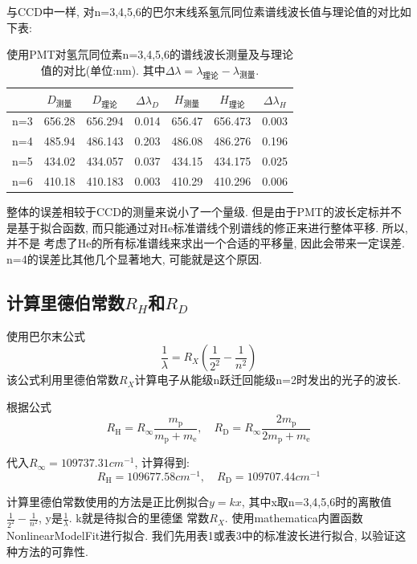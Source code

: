 \documentclass[12pt,a4paper]{article}
\begin{document}
与CCD中一样, 对n=3,4,5,6的巴尔末线系氢氘同位素谱线波长值与理论值的对比如下表: 
\begin{table}[H]
    \centering
    \begin{tabular}{|c|c|c|c|c|c|c|}
    \hline
        & $D_{\text{测量}}$      & $D_{\text{理论}}$      & $\Delta \lambda_{D} $ & $H_{\text{测量}}$      & $H_{\text{理论}}$     & $\Delta \lambda_{H} $  \\ \hline
    n=3 & 656.28 & 656.294 & 0.014 & 656.47 & 656.473 & 0.003 \\ \hline
    n=4 & 485.94 & 486.143 & 0.203 & 486.08 & 486.276 & 0.196 \\ \hline
    n=5 & 434.02 & 434.057 & 0.037 & 434.15 & 434.175 & 0.025 \\ \hline
    n=6 & 410.18 & 410.183 & 0.003 & 410.29 & 410.296& 0.006 \\ \hline
    \end{tabular}
    \caption{使用PMT对氢氘同位素n=3,4,5,6的谱线波长测量及与理论值的对比(单位:nm).
    其中$\Delta \lambda=\lambda_{\text{理论}}-\lambda_{\text{测量}}$.}
    \end{table}
整体的误差相较于CCD的测量来说小了一个量级. 但是由于PMT的波长定标并不是基于拟合函数, 而只能通过对He标准谱线个别谱线的修正来进行整体平移. 所以, 并不是
考虑了He的所有标准谱线来求出一个合适的平移量, 因此会带来一定误差. n=4的误差比其他几个显著地大, 可能就是这个原因. 

\subsection{计算里德伯常数$R_{H}$和$R_{D}$}
使用巴尔末公式
\begin{equation}
    \frac{1}{\lambda}=R_{X}(\frac{1}{2^2}-\frac{1}{n^2})
\end{equation}
该公式利用里德伯常数$R_{X}$计算电子从能级n跃迁回能级n=2时发出的光子的波长. 

根据公式
\begin{equation}
    R_{\mathrm{H}}=R_{\infty} \frac{m_{\mathrm{p}}}{m_{\mathrm{p}}+m_{\mathrm{e}}}, \quad R_{\mathrm{D}}=R_{\infty} \frac{2 m_{\mathrm{p}}}{2 m_{\mathrm{p}}+m_{\mathrm{e}}}
\end{equation}

代入$R_{\infty}=109737.31 cm^{-1}$, 计算得到:
\begin{equation}
    R_{\mathrm{H}}=109677.58cm^{-1}, \quad R_{\mathrm{D}}=109707.44cm^{-1}
\end{equation}
    
计算里德伯常数使用的方法是正比例拟合$y=kx$, 其中x取n=3,4,5,6时的离散值$\frac{1}{2^2}-\frac{1}{n^2}$, y是$\frac{1}{\lambda}$. k就是待拟合的里德堡
常数$R_{X}$. 使用mathematica内置函数NonlinearModelFit进行拟合. 我们先用表1或表3中的标准波长进行拟合, 以验证这种方法的可靠性.
\end{document}
